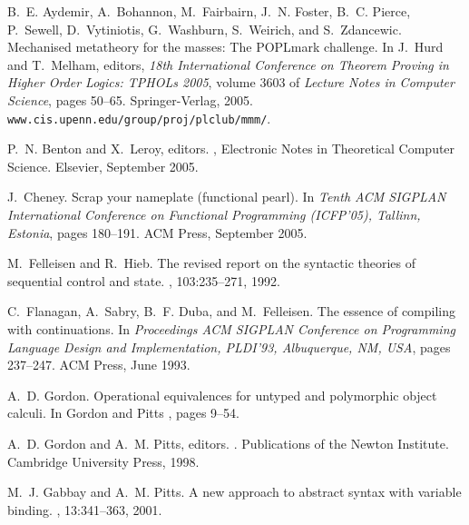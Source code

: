 \documentclass{LMCS}
\theoremstyle{plain}
\theoremstyle{definition}
\begin{document}
\newcommand{\etalchar}[1]{$^{#1}$}
\begin{thebibliography}{MTHM97}

\bibitem[ABF{\etalchar{+}}05]{PierceBP:mecmmp}
B.~E. Aydemir, A.~Bohannon, M.~Fairbairn, J.~N. Foster, B.~C. Pierce,
  P.~Sewell, D.~Vytiniotis, G.~Washburn, S.~Weirich, and S.~Zdancewic.
\newblock Mechanised metatheory for the masses: The {POPLmark} challenge.
\newblock In J.~Hurd and T.~Melham, editors, {\em 18th International Conference
  on Theorem Proving in Higher Order Logics: TPHOLs 2005}, volume 3603 of {\em
  Lecture Notes in Computer Science}, pages 50--65. Springer-Verlag, 2005.
\newblock \texttt{www.cis.upenn.edu/group/proj/plclub/mmm/}.

P.~N. Benton and X.~Leroy, editors.
,
  Electronic Notes in Theoretical Computer Science. Elsevier, September 2005.

J.~Cheney.
\newblock Scrap your nameplate (functional pearl).
\newblock In {\em Tenth {ACM SIGPLAN} International Conference on Functional
  Programming (ICFP'05), Tallinn, Estonia}, pages 180--191. ACM Press,
  September 2005.

M.~Felleisen and R.~Hieb.
\newblock The revised report on the syntactic theories of sequential control
  and state.
, 103:235--271, 1992.

C.~Flanagan, A.~Sabry, B.~F. Duba, and M.~Felleisen.
\newblock The essence of compiling with continuations.
\newblock In {\em Proceedings {ACM} {SIGPLAN} Conference on Programming
  Language Design and Implementation, {PLDI}'93, Albuquerque, {NM}, {USA}},
  pages 237--247. ACM Press, June 1993.

A.~D. Gordon.
\newblock Operational equivalences for untyped and polymorphic object calculi.
\newblock In Gordon and Pitts \cite{GordonAD:higoot}, pages 9--54.

A.~D. Gordon and A.~M. Pitts, editors.
.
\newblock Publications of the Newton Institute. Cambridge University Press,
  1998.

M.~J. Gabbay and A.~M. Pitts.
\newblock A new approach to abstract syntax with variable binding.
, 13:341--363, 2001.


\end{thebibliography}
\end{document}
